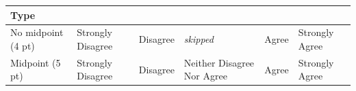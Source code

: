\documentclass[
  english,
]{book}
\begin{document}
\begin{longtable}[]{@{}llllll@{}}
\toprule
\begin{minipage}[b]{0.16\columnwidth}\raggedright
Type\strut
\end{minipage} & \begin{minipage}[b]{0.16\columnwidth}\raggedright
\strut
\end{minipage} & \begin{minipage}[b]{0.08\columnwidth}\raggedright
\strut
\end{minipage} & \begin{minipage}[b]{0.23\columnwidth}\raggedright
\strut
\end{minipage} & \begin{minipage}[b]{0.08\columnwidth}\raggedright
\strut
\end{minipage} & \begin{minipage}[b]{0.14\columnwidth}\raggedright
\strut
\end{minipage}\tabularnewline
\midrule
\endhead
\begin{minipage}[t]{0.16\columnwidth}\raggedright
No midpoint (4 pt)\strut
\end{minipage} & \begin{minipage}[t]{0.16\columnwidth}\raggedright
Strongly Disagree\strut
\end{minipage} & \begin{minipage}[t]{0.08\columnwidth}\raggedright
Disagree\strut
\end{minipage} & \begin{minipage}[t]{0.23\columnwidth}\raggedright
\emph{skipped}\strut
\end{minipage} & \begin{minipage}[t]{0.08\columnwidth}\raggedright
Agree\strut
\end{minipage} & \begin{minipage}[t]{0.14\columnwidth}\raggedright
Strongly Agree\strut
\end{minipage}\tabularnewline
\begin{minipage}[t]{0.16\columnwidth}\raggedright
Midpoint (5 pt)\strut
\end{minipage} & \begin{minipage}[t]{0.16\columnwidth}\raggedright
Strongly Disagree\strut
\end{minipage} & \begin{minipage}[t]{0.08\columnwidth}\raggedright
Disagree\strut
\end{minipage} & \begin{minipage}[t]{0.23\columnwidth}\raggedright
Neither Disagree Nor Agree\strut
\end{minipage} & \begin{minipage}[t]{0.08\columnwidth}\raggedright
Agree\strut
\end{minipage} & \begin{minipage}[t]{0.14\columnwidth}\raggedright
Strongly Agree\strut
\end{minipage}\tabularnewline
\bottomrule
\end{longtable}
\end{document}

